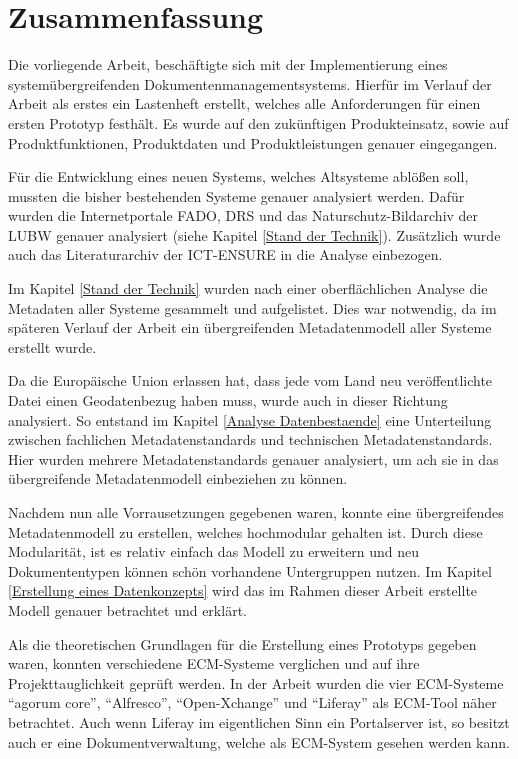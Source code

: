 \section{Zusammenfassung}
Die vorliegende Arbeit, besch\"aftigte sich mit der Implementierung eines system\"ubergreifenden Dokumentenmanagementsystems.
Hierf\"ur im Verlauf der Arbeit als erstes ein Lastenheft erstellt, welches alle Anforderungen f\"ur einen ersten Prototyp festh\"alt.
Es wurde auf den zuk\"unftigen Produkteinsatz, sowie auf Produktfunktionen, Produktdaten und Produktleistungen genauer eingegangen.

F\"ur die Entwicklung eines neuen Systems, welches Altsysteme abl\"o\ss{}en soll, mussten die bisher bestehenden Systeme genauer analysiert werden. Daf\"ur wurden die Internetportale \ac{FADO}, \ac{DRS} und das Naturschutz-Bildarchiv der LUBW genauer analysiert (siehe Kapitel \ref{Stand der Technik}). Zus\"atzlich wurde auch das Literaturarchiv der \ac{ICT-ENSURE} in die Analyse einbezogen.

Im Kapitel \ref{Stand der Technik} wurden nach einer oberfl\"achlichen Analyse die Metadaten aller Systeme gesammelt und aufgelistet. Dies war notwendig, da im sp\"ateren Verlauf der Arbeit ein \"ubergreifenden Metadatenmodell aller Systeme erstellt wurde.

Da die Europ\"aische Union erlassen hat, dass jede vom Land neu ver\"offentlichte Datei einen Geodatenbezug haben muss, wurde auch in dieser Richtung analysiert. So entstand im Kapitel \ref{Analyse Datenbestaende} eine Unterteilung zwischen fachlichen Metadatenstandards und technischen Metadatenstandards. Hier wurden mehrere Metadatenstandards genauer analysiert, um ach sie in das \"ubergreifende Metadatenmodell einbeziehen zu k\"onnen.

Nachdem nun alle Vorrausetzungen gegebenen waren, konnte eine \"ubergreifendes Metadatenmodell zu erstellen, welches hochmodular gehalten ist. Durch diese Modularit\"at, ist es relativ einfach das Modell zu erweitern und neu Dokumententypen k\"onnen sch\"on vorhandene Untergruppen nutzen. Im Kapitel \ref{Erstellung eines Datenkonzepts} wird das im Rahmen dieser Arbeit erstellte Modell genauer betrachtet und erkl\"art.

Als die theoretischen Grundlagen f\"ur die Erstellung eines Prototyps gegeben waren, konnten verschiedene ECM-Systeme verglichen und auf ihre Projekttauglichkeit gepr\"uft werden. In der Arbeit wurden die vier ECM-Systeme "`agorum core"', "`Alfresco"', "`Open-Xchange"' und "`Liferay"' als ECM-Tool n\"aher betrachtet. Auch wenn Liferay im eigentlichen Sinn ein Portalserver ist, so besitzt auch er eine Dokumentverwaltung, welche als ECM-System gesehen werden kann. 

